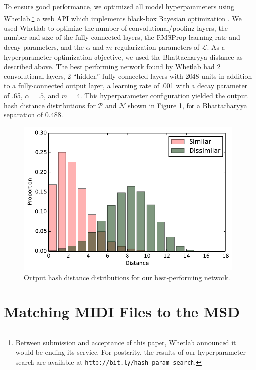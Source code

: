 \documentclass{article}
\begin{document}
To ensure good performance, we optimized all model hyperparameters using Whetlab,\footnote{Between submission and acceptance of this paper, Whetlab announced it would be ending its service.  For posterity, the results of our hyperparameter search are available at \texttt{http://bit.ly/hash-param-search}.} a web API which implements black-box Bayesian optimization \cite{snoek2012practical}.
We used Whetlab to optimize the number of convolutional/pooling layers, the number and size of the fully-connected layers, the RMSProp learning rate and decay parameters, and the $\alpha$ and $m$ regularization parameters of $\mathcal{L}$.
As a hyperparameter optimization objective, we used the Bhattacharyya distance as described above.
The best performing network found by Whetlab had 2 convolutional layers, 2 ``hidden'' fully-connected layers with 2048 units in addition to a fully-connected output layer, a learning rate of .001 with a decay parameter of .65, $\alpha = .5$, and $m = 4$.
This hyperparameter configuration yielded the output hash distance distributions for $\mathcal{P}$ and $\mathcal{N}$ shown in Figure \ref{fig:distances}, for a Bhattacharyya separation of $0.488$.

\begin{figure}
  \includegraphics[width=\columnwidth]{hash_distributions.pdf}
  \caption{Output hash distance distributions for our best-performing network.}
  \label{fig:distances}
\end{figure}

\section{Matching MIDI Files to the MSD}
\label{sec:msd}
\end{document}

